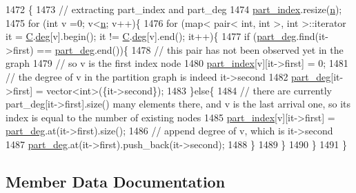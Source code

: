 \begin{DoxyCode}
1472 \{
1473   \textcolor{comment}{// extracting part\_index and part\_deg}
1474   \hyperlink{classmarked__graph__encoder_a1d3e2b90f5d46244fd4cb33c69ac81f1}{part\_index}.resize(\hyperlink{classmarked__graph__encoder_a4c66d9fdbc14c97523715aac7e4511cb}{n});
1475   \textcolor{keywordflow}{for} (\textcolor{keywordtype}{int} v =0; v<\hyperlink{classmarked__graph__encoder_a4c66d9fdbc14c97523715aac7e4511cb}{n}; v++)\{
1476     \textcolor{keywordflow}{for} (map< pair< int, int >, \textcolor{keywordtype}{int} >::iterator it = \hyperlink{classmarked__graph__encoder_af82bc0653414091291cb75553a407bdb}{C}.\hyperlink{classcolored__graph_ae3269d35c1b022bc70d195bebd4e1b8a}{deg}[v].begin(); it != 
      \hyperlink{classmarked__graph__encoder_af82bc0653414091291cb75553a407bdb}{C}.\hyperlink{classcolored__graph_ae3269d35c1b022bc70d195bebd4e1b8a}{deg}[v].end(); it++)\{
1477       \textcolor{keywordflow}{if} (\hyperlink{classmarked__graph__encoder_a55ea2edb2609dfc287432f61900d6ad1}{part\_deg}.find(it->first) == \hyperlink{classmarked__graph__encoder_a55ea2edb2609dfc287432f61900d6ad1}{part\_deg}.end())\{
1478         \textcolor{comment}{// this pair has not been observed yet in the graph}
1479         \textcolor{comment}{// so v is the first index node}
1480         \hyperlink{classmarked__graph__encoder_a1d3e2b90f5d46244fd4cb33c69ac81f1}{part\_index}[v][it->first] = 0;
1481         \textcolor{comment}{// the degree of v in the partition graph is indeed it->second}
1482         \hyperlink{classmarked__graph__encoder_a55ea2edb2609dfc287432f61900d6ad1}{part\_deg}[it->first] = vector<int>(\{it->second\}); 
1483       \}\textcolor{keywordflow}{else}\{
1484         \textcolor{comment}{// there are currently part\_deg[it->first].size() many elements there, and v is the last arrival
       one, so its index is equal to the number of existing nodes }
1485         \hyperlink{classmarked__graph__encoder_a1d3e2b90f5d46244fd4cb33c69ac81f1}{part\_index}[v][it->first] = \hyperlink{classmarked__graph__encoder_a55ea2edb2609dfc287432f61900d6ad1}{part\_deg}.at(it->first).size();
1486         \textcolor{comment}{// append degree of v, which is it->second}
1487         \hyperlink{classmarked__graph__encoder_a55ea2edb2609dfc287432f61900d6ad1}{part\_deg}.at(it->first).push\_back(it->second); 
1488       \}
1489     \}
1490   \}
1491 \}
\end{DoxyCode}


\subsection{Member Data Documentation}
\mbox{\label{classmarked__graph__encoder_af82bc0653414091291cb75553a407bdb}} 
